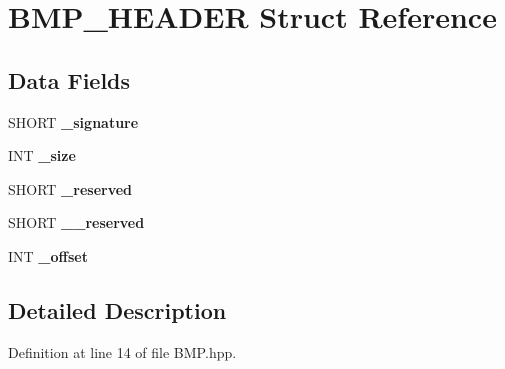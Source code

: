 \hypertarget{struct_b_m_p___h_e_a_d_e_r}{}\section{B\+M\+P\+\_\+\+H\+E\+A\+D\+ER Struct Reference}
\label{struct_b_m_p___h_e_a_d_e_r}
\subsection*{Data Fields}
\begin{DoxyCompactItemize}
\item 
S\+H\+O\+RT {\bfseries \+\_\+signature}\hypertarget{struct_b_m_p___h_e_a_d_e_r_a8e28f3e072eda68a6f360fe280a63d66}{}\label{struct_b_m_p___h_e_a_d_e_r_a8e28f3e072eda68a6f360fe280a63d66}

\item 
I\+NT {\bfseries \+\_\+size}\hypertarget{struct_b_m_p___h_e_a_d_e_r_aec195a5228186b9c32f8a93133b5a9b9}{}\label{struct_b_m_p___h_e_a_d_e_r_aec195a5228186b9c32f8a93133b5a9b9}

\item 
S\+H\+O\+RT {\bfseries \+\_\+reserved}\hypertarget{struct_b_m_p___h_e_a_d_e_r_ad64eddcac86911e65d41955b0b15744e}{}\label{struct_b_m_p___h_e_a_d_e_r_ad64eddcac86911e65d41955b0b15744e}

\item 
S\+H\+O\+RT {\bfseries \+\_\+\+\_\+reserved}\hypertarget{struct_b_m_p___h_e_a_d_e_r_a299e66558c91abdabe3a661c257329f9}{}\label{struct_b_m_p___h_e_a_d_e_r_a299e66558c91abdabe3a661c257329f9}

\item 
I\+NT {\bfseries \+\_\+offset}\hypertarget{struct_b_m_p___h_e_a_d_e_r_a0ae360efd03820bad6781c1ecb6073e9}{}\label{struct_b_m_p___h_e_a_d_e_r_a0ae360efd03820bad6781c1ecb6073e9}

\end{DoxyCompactItemize}


\subsection{Detailed Description}


Definition at line 14 of file B\+M\+P.\+hpp.

